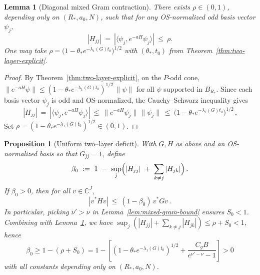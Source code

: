 \documentclass[11pt]{amsart}
\theoremstyle{plain}
\newtheorem{lemma}[theorem]{Lemma}
\newtheorem{proposition}[theorem]{Proposition}
\theoremstyle{definition}
\theoremstyle{remark}
\begin{document}
\begin{lemma}[Diagonal mixed Gram contraction]\label{lem:diag-mixed-bound}
There exists $\rho\in(0,1)$, depending only on $(R_*,a_0,N)$, such that for any OS-normalized odd basis vector $\psi_j$,
\[
  |H_{jj}|\ =\ |\langle\psi_j, e^{-aH}\psi_j\rangle|\ \le\ \rho.
\]
  One may take $\rho=\bigl(1-\theta_* e^{-\lambda_1(G) t_0}\bigr)^{1/2}$ with $(\theta_*,t_0)$ from Theorem~\ref{thm:two-layer-explicit}.
\end{lemma}

\begin{proof}
By Theorem~\ref{thm:two-layer-explicit}, on the $P$-odd cone, $\|e^{-aH}\psi\|\le (1-\theta_* e^{-\lambda_1(G) t_0})^{1/2}\,\|\psi\|$ for all $\psi$ supported in $B_{R_*}$. Since each basis vector $\psi_j$ is odd and OS-normalized, the Cauchy–Schwarz inequality gives
\[
  |H_{jj}|\ =\ |\langle\psi_j, e^{-aH}\psi_j\rangle|\ \le\ \|e^{-aH}\psi_j\|\,\|\psi_j\|\ \le\ \bigl(1-\theta_* e^{-\lambda_1(G) t_0}\bigr)^{1/2}\,.
\]
Set $\rho=(1-\theta_* e^{-\lambda_1(G) t_0})^{1/2}\in(0,1)$.
\end{proof}

\begin{proposition}[Uniform two--layer deficit]\label{prop:two-layer-deficit}
With $G,H$ as above and an OS-normalized basis so that $G_{jj}=1$, define
\[
  \beta_0\ :=\ 1\ -\ \sup_j\Bigl(|H_{jj}|\ +\ \sum_{k\ne j}|H_{jk}|\Bigr)\,.
\]
If $\beta_0>0$, then for all $v\in\mathbb C^{J}$,
\[
  |v^* H v|\ \le\ (1-\beta_0)\, v^* G v\,.
\]
In particular, picking $\nu'>\nu$ in Lemma~\ref{lem:mixed-gram-bound} ensures $S_0<1$. Combining with Lemma~\ref{lem:diag-mixed-bound}, we have $\sup_j(|H_{jj}|+\sum_{k\ne j}|H_{jk}|)\le \rho+S_0<1$, hence 
\[
  \beta_0 \ge 1-(\rho+S_0) = 1 - \left[(1-\theta_* e^{-\lambda_1(G) t_0})^{1/2} + \frac{C_g B}{e^{\nu'-\nu}-1}\right] > 0
\]
with all constants depending only on $(R_*,a_0,N)$.
\end{proposition}
\end{document}
